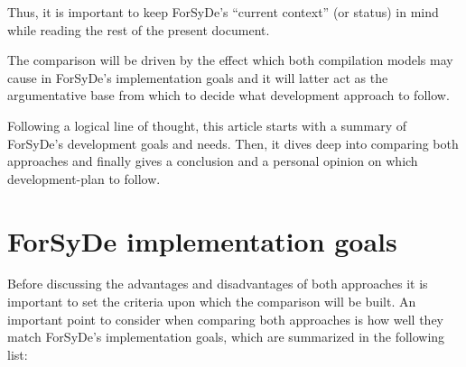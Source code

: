 \documentclass[a4paper,twoside,11pt]{article}
\begin{document}
Thus, it is important to keep ForSyDe's ``current context'' (or status) in mind
while reading the rest of the present document.

The comparison will be driven by the effect which both compilation models may
cause in ForSyDe's implementation goals and it will latter act as the
argumentative base from which to decide what development approach to follow.

Following a logical line of thought, this article starts with a summary of
ForSyDe's development goals and needs. Then, it dives deep into comparing both
approaches and finally gives a conclusion and a personal opinion on which
development-plan to follow.

\section{ForSyDe implementation goals}
Before discussing the advantages and disadvantages of both approaches it is
important to set the criteria upon which the comparison will be built. An
important point to consider when comparing both approaches is how well they
match ForSyDe's implementation goals, which are summarized in the following
list:
\end{document}
